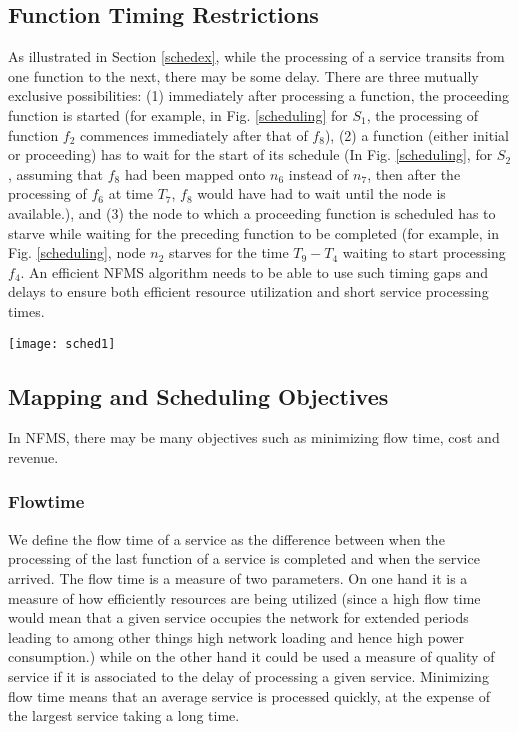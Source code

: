 \documentclass[conference]{IEEEtran}
\begin{document}
\subsection{Function Timing Restrictions}\label{mutualexc}
As illustrated in Section \ref{schedex}, while the processing of a service transits from one function to the next, there may be some delay. There are three mutually exclusive possibilities: (1) immediately after processing a function, the proceeding function is started (for example, in Fig. \ref{scheduling} for $S_1$, the processing of function $f_2$ commences immediately after that of $f_8$), (2) a function (either initial or proceeding) has to wait for the start of its schedule (In Fig. \ref{scheduling}, for $S_2$, assuming that $f_8$ had been mapped onto $n_6$ instead of $n_7$, then after the processing of $f_6$ at time $T_7$, $f_8$ would have had to wait until the node is available.), and (3) the node to which a proceeding function is scheduled has to starve while waiting for the preceding function to be completed (for example, in Fig. \ref{scheduling}, node $n_2$ starves for the time $T_9 - T_4$ waiting to start processing $f_4$. An efficient NFMS algorithm needs to be able to use such timing gaps and delays to ensure both efficient resource utilization and short service processing times.
\begin{figure*}[t]
\setlength{\abovecaptionskip}{7pt plus 0pt minus 0pt}
\setlength{\belowcaptionskip}{-5pt plus 0pt minus 0pt}
\begin{minipage}{.99\textwidth}
\centering
\resizebox{.99\textwidth}{!}
{\texttt{[image: sched1]}}
  \caption{Function Scheduling}
  \label{scheduling}
  \end{minipage}
\end{figure*}

\subsection{Mapping and Scheduling Objectives}\label{objectives}
In NFMS, there may be many objectives such as minimizing flow time, cost and revenue. 
\subsubsection{Flowtime}
We define the flow time of a service as the difference between when the processing of the last function of a service is completed and when the service arrived. The flow time is a measure of two parameters. On one hand it is a measure of how efficiently resources are being utilized (since a high flow time would mean that a given service occupies the network for extended periods leading to among other things high network loading and hence high power consumption.) while on the other hand it could be used a measure of quality of service if it is associated to the delay of processing a given service. Minimizing flow time means that an average service is processed quickly, at the expense of the largest service taking a long time.
\end{document}

